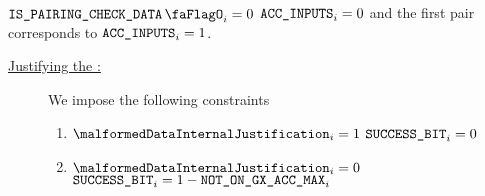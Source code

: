 \saNote{} \If $\isBlsPairingCheckData_{i} = 0$ \Then $\texttt{ACC\_INPUTS}_{i} = 0$ and the first pair corresponds to $\texttt{ACC\_INPUTS}_{i} = 1$.
\begin{description}
    \item[\underline{Justifying the \blsSuccessBit{}:}]
          We impose the following constraints
          \begin{enumerate}
              \item \If $\malformedDataInternalJustification _{i}= 1$ \Then $\texttt{SUCCESS\_BIT} _{i} = 0$
              \item \If $\malformedDataInternalJustification _{i}= 0$ \Then $\texttt{SUCCESS\_BIT}_{i} = 1 - \texttt{NOT\_ON\_GX\_ACC\_MAX} _{i}$
          \end{enumerate}
\end{description}
